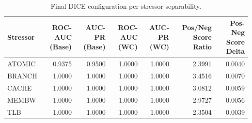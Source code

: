 \begin{table}[t]
\centering
\caption{Final DICE configuration per-stressor separability.}
\label{tab:dice_full_stressor}
\footnotesize
\begin{tabular}{lrrrrrr}
\toprule
Stressor & ROC-AUC (Base) & AUC-PR (Base) & ROC-AUC (WC) & AUC-PR (WC) & Pos/Neg Score Ratio & Pos-Neg Score Delta \\
\midrule
ATOMIC & 0.9375 & 0.9500 & 1.0000 & 1.0000 & 2.3991 & 0.0040 \\
BRANCH & 1.0000 & 1.0000 & 1.0000 & 1.0000 & 3.4516 & 0.0070 \\
CACHE & 1.0000 & 1.0000 & 1.0000 & 1.0000 & 3.0812 & 0.0059 \\
MEMBW & 1.0000 & 1.0000 & 1.0000 & 1.0000 & 2.9727 & 0.0056 \\
TLB & 1.0000 & 1.0000 & 1.0000 & 1.0000 & 2.3504 & 0.0039 \\
\bottomrule
\end{tabular}

\end{table}
